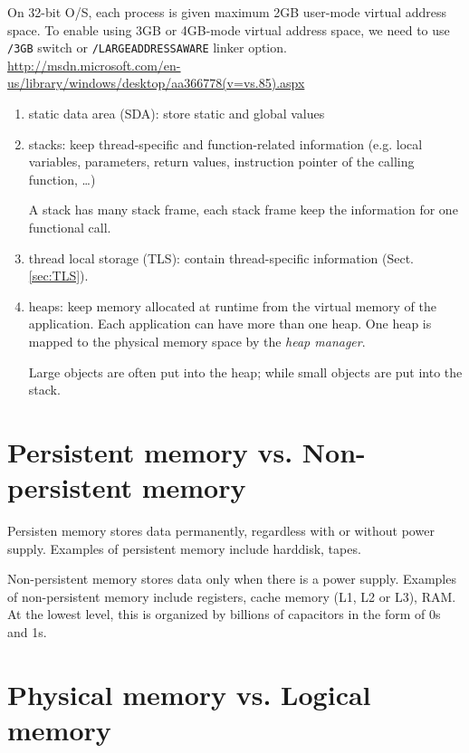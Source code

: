 \begin{itemize}
  On 32-bit O/S, each process is given maximum 2GB user-mode virtual address
  space. To enable using 3GB or 4GB-mode virtual address space, we need to use
  \verb!/3GB! switch or \verb!/LARGEADDRESSAWARE! linker option.
  \url{http://msdn.microsoft.com/en-us/library/windows/desktop/aa366778(v=vs.85).aspx}

  \begin{enumerate}
    
      \item static data area (SDA): store static and global values 
  
  \item stacks: keep thread-specific and function-related information (e.g.
  local variables, parameters, return values, instruction pointer of the
  calling function, \ldots)
  
  A stack has many stack frame, each stack frame keep the information for one
  functional call.
  
  \item thread local storage (TLS): contain thread-specific information
  (Sect.\ref{sec:TLS}).
  
  \item heaps: keep memory allocated at runtime from the virtual memory
  of the application. Each application can have more than one heap. One heap
  is mapped to the physical memory space by the {\it heap manager}.  
  
  Large objects are often put into the heap; while small objects are put into
  the stack.
  
  \end{enumerate}
  
\end{itemize}

\section{Persistent memory vs. Non-persistent memory}

Persisten memory stores data permanently, regardless with or without power
supply. Examples of persistent memory include harddisk, tapes.

Non-persistent memory stores data only when there is a power supply. 
Examples of non-persistent memory include registers, cache memory (L1, L2 or
L3), RAM. At the lowest level, this is organized by billions of capacitors in
the form of 0s and 1s.

\section{Physical memory vs. Logical memory}

